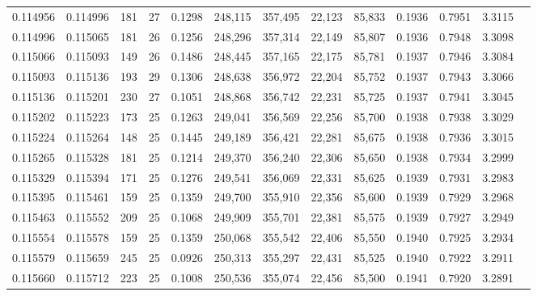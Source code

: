 \begin{tabular}{rrrrrrrrrrrrr}
0.114956 & 0.114996 & 181 &  27 &                                     0.1298 & 248,115 & 357,495 &  22,123 &  85,833 & 0.1936 & 0.7951 & 3.3115 \\
0.114996 & 0.115065 & 181 &  26 &                                     0.1256 & 248,296 & 357,314 &  22,149 &  85,807 & 0.1936 & 0.7948 & 3.3098 \\
0.115066 & 0.115093 & 149 &  26 &                                     0.1486 & 248,445 & 357,165 &  22,175 &  85,781 & 0.1937 & 0.7946 & 3.3084 \\
0.115093 & 0.115136 & 193 &  29 &                                     0.1306 & 248,638 & 356,972 &  22,204 &  85,752 & 0.1937 & 0.7943 & 3.3066 \\
0.115136 & 0.115201 & 230 &  27 &                                     0.1051 & 248,868 & 356,742 &  22,231 &  85,725 & 0.1937 & 0.7941 & 3.3045 \\
0.115202 & 0.115223 & 173 &  25 &                                     0.1263 & 249,041 & 356,569 &  22,256 &  85,700 & 0.1938 & 0.7938 & 3.3029 \\
0.115224 & 0.115264 & 148 &  25 &                                     0.1445 & 249,189 & 356,421 &  22,281 &  85,675 & 0.1938 & 0.7936 & 3.3015 \\
0.115265 & 0.115328 & 181 &  25 &                                     0.1214 & 249,370 & 356,240 &  22,306 &  85,650 & 0.1938 & 0.7934 & 3.2999 \\
0.115329 & 0.115394 & 171 &  25 &                                     0.1276 & 249,541 & 356,069 &  22,331 &  85,625 & 0.1939 & 0.7931 & 3.2983 \\
0.115395 & 0.115461 & 159 &  25 &                                     0.1359 & 249,700 & 355,910 &  22,356 &  85,600 & 0.1939 & 0.7929 & 3.2968 \\
0.115463 & 0.115552 & 209 &  25 &                                     0.1068 & 249,909 & 355,701 &  22,381 &  85,575 & 0.1939 & 0.7927 & 3.2949 \\
0.115554 & 0.115578 & 159 &  25 &                                     0.1359 & 250,068 & 355,542 &  22,406 &  85,550 & 0.1940 & 0.7925 & 3.2934 \\
0.115579 & 0.115659 & 245 &  25 &                                     0.0926 & 250,313 & 355,297 &  22,431 &  85,525 & 0.1940 & 0.7922 & 3.2911 \\
0.115660 & 0.115712 & 223 &  25 &                                     0.1008 & 250,536 & 355,074 &  22,456 &  85,500 & 0.1941 & 0.7920 & 3.2891 \\

\end{tabular}
